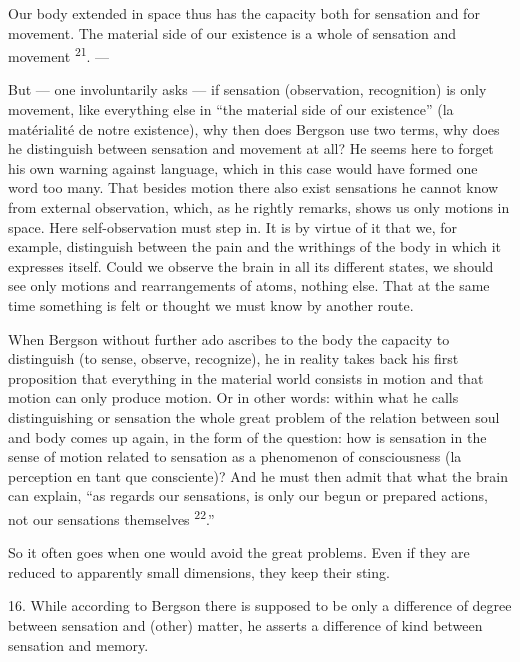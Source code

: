 \documentclass[12pt,a4paper,openany]{book}
\newcommand{\opage}[1]{\marginnote{\footnotesize\textit{[#1]}}}
\newcommand{\nm}[1]{\unskip\textsuperscript{#1}}
\begin{document}
Our body extended in space thus has the capacity both for sensation and for movement. The material side of our existence is a whole of sensation and movement \nm{21}. ---

But --- one involuntarily asks --- if sensation (observation, recognition) is only movement, like everything else in ``the material side of our existence'' (la matérialité de notre existence), why then does Bergson use two terms, why does he distinguish between sensation and movement at all? He seems here to forget his own warning against language, which in this case would have formed one word too many. That besides motion there also exist sensations he cannot know from external observation, which, as he rightly remarks, shows us only motions in space. Here self-observation must step in. It is by virtue of it that we, for example, distinguish between the pain and the writhings of the body in which it expresses itself. Could we observe the brain in all its different states, we should see only motions and rearrangements of atoms, nothing else. That at the same time something is felt or thought we must know by another route.

When Bergson without further ado ascribes to the body the capacity to distinguish (to sense, observe, recognize), he in reality takes back his first proposition that everything in the material world consists in motion and that motion can only produce motion. Or in other words: within what he calls distinguishing or sensation the whole great problem of the relation between soul and body comes up again, in the form of the question: how is sensation in the sense of motion related to sensation as a phenomenon of consciousness (la perception en tant que consciente)? And he must then admit that what the brain can explain, ``as regards our sensations, is only our begun or prepared actions, %
not our sensations themselves \nm{22}.''

So it often goes when one would avoid the great problems. Even if they are reduced to apparently small dimensions, they keep their sting.

16. While according to Bergson there is supposed to be only a difference of
\opage{30}degree between sensation and (other) matter, he asserts a difference of kind between sensation and memory.
\end{document}
